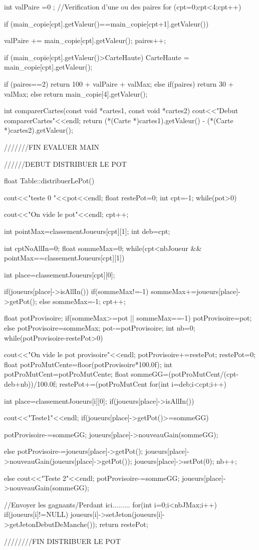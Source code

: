 \documentclass{article}
\begin{document}
{    int valPaire =0 ;
    //Verification d'une ou des paires
    for (cpt=0;cpt<4;cpt++){
        if (main_copie[cpt].getValeur()==main_copie[cpt+1].getValeur()){
	   valPaire += main_copie[cpt].getValeur();
           paires++;
	   
           if (main_copie[cpt].getValeur()>CarteHaute)
              CarteHaute = main_copie[cpt].getValeur();
        }
    }
    if (paires==2)
    {
        return  100 + valPaire + valMax;
    }
    else if(paires)
         return 30 + valMax;
    else
         return main_copie[4].getValeur();

}

int comparerCartes(const void *cartes1, const void *cartes2){
  cout<<"Debut comparerCartes"<<endl;
  return (*(Carte *)cartes1).getValeur() - (*(Carte *)cartes2).getValeur();
}



///////FIN EVALUER MAIN


//////DEBUT DISTRIBUER LE POT 

float Table::distribuerLePot(){
  cout<<"teste 0 "<<pot<<endl;
  float restePot=0;
  int cpt=-1;
  while(pot>0){
    cout<<"On vide le pot"<<endl;
    cpt++;
    
    int pointMax=classementJoueurs[cpt][1];
    int deb=cpt;
    
    int cptNoAllIn=0;
    float sommeMax=0;
    while(cpt<nbJoueur && pointMax==classementJoueurs[cpt][1]){
      int place=classementJoueurs[cpt][0];
    
      if(joueurs[place]->isAllIn()){
	if(sommeMax!=-1)
	  sommeMax+=joueurs[place]->getPot();
      }
      else{
	sommeMax=-1;
      }
      cpt++;
    }      
    float potProvisoire;
    if(sommeMax>=pot || sommeMax==-1){
      potProvisoire=pot;
    }
    else{
      potProvisoire=sommeMax;
    }
    pot-=potProvisoire;
    int nb=0;
    while(potProvisoire-restePot>0){
      cout<<"On vide le pot provisoire"<<endl;
      potProvisoire+=restePot;
      restePot=0;
      float potProMutCente=floor(potProvisoire*100.0f);
      int potProMutCent=potProMutCente;
      float sommeGG=(potProMutCent/(cpt-deb+nb))/100.0f;
      restePot+=(potProMutCent%
      for(int i=deb;i<cpt;i++){
	int place=classementJoueurs[i][0];
	if(joueurs[place]->isAllIn()){
	  cout<<"Teste1"<<endl;
	  if(joueurs[place]->getPot()>=sommeGG){
	    potProvisoire-=sommeGG;
	    joueurs[place]->nouveauGain(sommeGG);
	    
	  }
	  else{
	    potProvisoire-=joueurs[place]->getPot();
	    joueurs[place]->nouveauGain(joueurs[place]->getPot());
	    joueurs[place]->setPot(0);
	    nb++;
	  }
	}
	else{
	  cout<<"Teste 2"<<endl;
	  potProvisoire-=sommeGG;
	  joueurs[place]->nouveauGain(sommeGG);
	}
      }
    }
  }
  //Envoyer les gagnants/Perdant ici.........
  for(int i=0;i<nbJMax;i++){
    if(joueurs[i]!=NULL){
      joueurs[i]->setJeton(joueurs[i]->getJetonDebutDeManche());
    }
  }
  return restePot;
}
////////FIN DISTRIBUER LE POT
\end{document}
